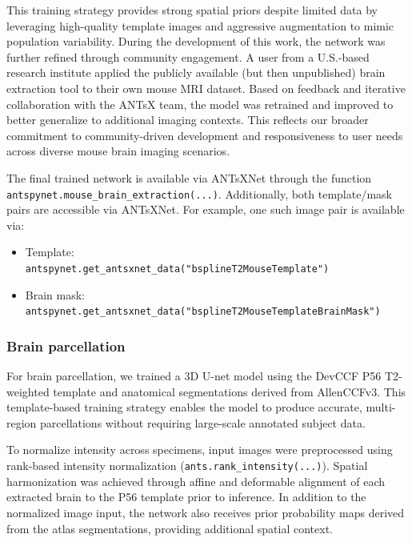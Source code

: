 \documentclass[
  12pt,
]{article}
\providecommand{\tightlist}{%
  \setlength{\itemsep}{0pt}\setlength{\parskip}{0pt}}
\begin{document}
This training strategy provides strong spatial priors despite limited
data by leveraging high-quality template images and aggressive
augmentation to mimic population variability. During the development of
this work, the network was further refined through community engagement.
A user from a U.S.-based research institute applied the publicly
available (but then unpublished) brain extraction tool to their own
mouse MRI dataset. Based on feedback and iterative collaboration with
the ANTsX team, the model was retrained and improved to better
generalize to additional imaging contexts. This reflects our broader
commitment to community-driven development and responsiveness to user
needs across diverse mouse brain imaging scenarios.

The final trained network is available via ANTsXNet through the
function\\
\texttt{antspynet.mouse\_brain\_extraction(...)}. Additionally, both
template/mask pairs are accessible via ANTsXNet. For example, one such
image pair is available via:

\begin{itemize}
\tightlist
\item
  Template:\\
  \texttt{antspynet.get\_antsxnet\_data("bsplineT2MouseTemplate")}
\item
  Brain mask:\\
  \texttt{antspynet.get\_antsxnet\_data("bsplineT2MouseTemplateBrainMask")}
\end{itemize}

\subsubsection{Brain parcellation}\label{brain-parcellation}

For brain parcellation, we trained a 3D U-net model using the DevCCF P56
T2-weighted template and anatomical segmentations derived from
AllenCCFv3. This template-based training strategy enables the model to
produce accurate, multi-region parcellations without requiring
large-scale annotated subject data.

To normalize intensity across specimens, input images were preprocessed
using rank-based intensity normalization
(\texttt{ants.rank\_intensity(...)}). Spatial harmonization was achieved
through affine and deformable alignment of each extracted brain to the
P56 template prior to inference. In addition to the normalized image
input, the network also receives prior probability maps derived from the
atlas segmentations, providing additional spatial context.
\end{document}
